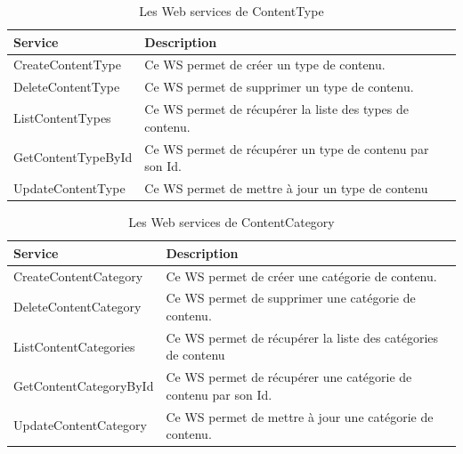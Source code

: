 \begin{table}[H]
    \centering
    \begin{tabular}{|m{5cm}|m{10cm}|}
        \hline
        \textbf{Service}   & \textbf{Description}                                     \\
        \hline
        CreateContentType  & Ce WS permet de créer un type de contenu.                \\
        \hline
        DeleteContentType  & Ce WS permet de supprimer un type de contenu.            \\
        \hline
        ListContentTypes   & Ce WS permet de récupérer la liste des types de contenu. \\
        \hline
        GetContentTypeById & Ce WS permet de récupérer un type de contenu par son Id. \\
        \hline

        UpdateContentType  & Ce WS permet de mettre à jour un type de contenu         \\
        \hline
    \end{tabular}
    \caption{Les Web services de ContentType}
    \label{tab:my_label}
\end{table}






\begin{table}[H]
    \centering
    \begin{tabular}{|m{5cm}|m{10cm}|}
        \hline
        \textbf{Service}       & \textbf{Description}                                           \\
        \hline
        CreateContentCategory  & Ce WS permet de créer une catégorie de contenu.                \\
        \hline
        DeleteContentCategory  & Ce WS permet de supprimer une catégorie de contenu.            \\
        \hline
        ListContentCategories  & Ce WS permet de récupérer la liste des catégories de contenu   \\
        \hline
        GetContentCategoryById & Ce WS permet de récupérer une catégorie de contenu par son Id. \\
        \hline
        UpdateContentCategory  & Ce WS permet de mettre à jour une catégorie de contenu.        \\
        \hline
    \end{tabular}
    \caption{Les Web services de ContentCategory}
    \label{tab:my_label}
\end{table}




